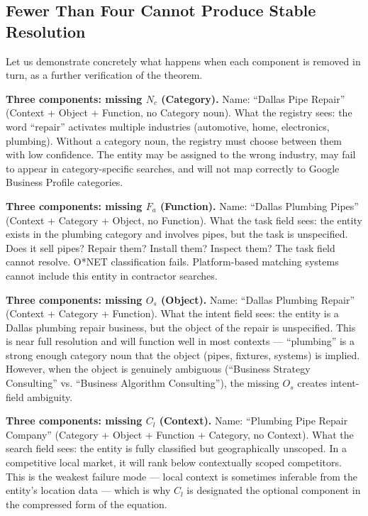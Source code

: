 \documentclass[12pt, openany]{book}
\theoremstyle{thmstyle}
\theoremstyle{defstyle}
\newcommand{\Nc}{N_c}
\newcommand{\Os}{O_s}
\newcommand{\Fa}{F_a}
\newcommand{\Cl}{C_l}
\begin{document}
\subsection{Fewer Than Four Cannot Produce Stable Resolution}

Let us demonstrate concretely what happens when each component is removed in turn, as a further verification of the theorem.

\textbf{Three components: missing $\Nc$ (Category).}
Name: ``Dallas Pipe Repair'' (Context + Object + Function, no Category noun).
What the registry sees: the word ``repair'' activates multiple industries (automotive, home, electronics, plumbing). Without a category noun, the registry must choose between them with low confidence. The entity may be assigned to the wrong industry, may fail to appear in category-specific searches, and will not map correctly to Google Business Profile categories.

\textbf{Three components: missing $\Fa$ (Function).}
Name: ``Dallas Plumbing Pipes'' (Context + Category + Object, no Function).
What the task field sees: the entity exists in the plumbing category and involves pipes, but the task is unspecified. Does it sell pipes? Repair them? Install them? Inspect them? The task field cannot resolve. O*NET classification fails. Platform-based matching systems cannot include this entity in contractor searches.

\textbf{Three components: missing $\Os$ (Object).}
Name: ``Dallas Plumbing Repair'' (Context + Category + Function).
What the intent field sees: the entity is a Dallas plumbing repair business, but the object of the repair is unspecified. This is near full resolution and will function well in most contexts --- ``plumbing'' is a strong enough category noun that the object (pipes, fixtures, systems) is implied. However, when the object is genuinely ambiguous (``Business Strategy Consulting'' vs. ``Business Algorithm Consulting''), the missing $\Os$ creates intent-field ambiguity.

\textbf{Three components: missing $\Cl$ (Context).}
Name: ``Plumbing Pipe Repair Company'' (Category + Object + Function + Category, no Context).
What the search field sees: the entity is fully classified but geographically unscoped. In a competitive local market, it will rank below contextually scoped competitors. This is the weakest failure mode --- local context is sometimes inferable from the entity's location data --- which is why $\Cl$ is designated the optional component in the compressed form of the equation.
\end{document}

